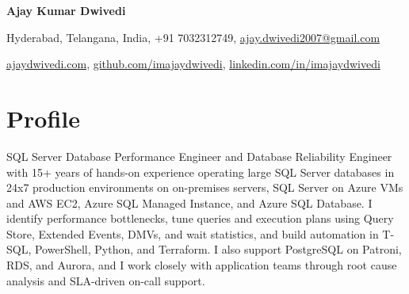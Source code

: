 \documentclass[10pt,a4paper]{article}
\begin{document}
\begin{center}
{\Huge\bfseries Ajay Kumar Dwivedi}

\vspace{6pt}
Hyderabad, Telangana, India, +91 7032312749, \href{mailto:ajay.dwivedi2007@gmail.com}{ajay.dwivedi2007@gmail.com}

\vspace{2pt}
\href{https://ajaydwivedi.com/}{ajaydwivedi.com}, \href{https://github.com/imajaydwivedi}{github.com/imajaydwivedi}, \href{https://linkedin.com/in/imajaydwivedi/}{linkedin.com/in/imajaydwivedi}
\end{center}

\section{Profile}
SQL Server Database Performance Engineer and Database Reliability Engineer with 15+ years of hands-on experience operating large SQL Server databases in 24x7 production environments on on-premises servers, SQL Server on Azure VMs and AWS EC2, Azure SQL Managed Instance, and Azure SQL Database. I identify performance bottlenecks, tune queries and execution plans using Query Store, Extended Events, DMVs, and wait statistics, and build automation in T-SQL, PowerShell, Python, and Terraform. I also support PostgreSQL on Patroni, RDS, and Aurora, and I work closely with application teams through root cause analysis and SLA-driven on-call support.
\end{document}
